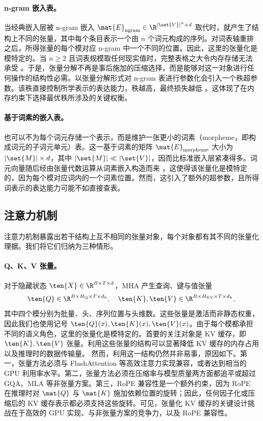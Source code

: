 \paragraph{n-gram 嵌入表。}

当经典嵌入层被 n-gram 嵌入 $\mat{E}_{\rm ngram} \in \R^{|\set{V}|^n\times d}$ \cite{huang2025overtokenized} 取代时，就产生了结构上不同的张量，其中每个条目表示一个由 $n$ 个词元构成的序列。对词表轴重排之后，所得张量的每个模对应 n-gram 中一个不同的位置。因此，这里的张量化是模特定的。当 $n\ge 2$ 且词表规模取任何现实值时，完整表格之大令内存存储无法承受 \cite{zhou2026tensorizingengram}。于是，张量分解不再是事后施加的压缩选择，而是能够对这一对象进行任何操作的结构性必需。以张量分解形式对 n-gram 表进行参数化会引入一个秩超参数。该秩直接控制所学表示的表达能力，秩越高，最终损失越低 \cite{zhou2026tensorizingengram}。这体现了在内存约束下选择最优秩所涉及的关键权衡。

\paragraph{基于词素的嵌入表。} 

也可以不为每个词元存储一个表示，而是维护一张更小的词素（morpheme，即构成词元的子词元单元）表。这一基于词素的矩阵 $\mat{E}_{\rm morpheme}$ 大小为 $|\set{M}| \times d$，其中 $|\set{M}| \ll |\set{V}|$，因而比标准嵌入层紧凑得多。词元向量随后经由张量代数运算从词素嵌入构造而来 \cite{gan2022morphte}，这使得该张量化是模特定的，因为每个模对应词内的一个词素位置。然而，这引入了额外的超参数，且所得词表示的表达能力可能不如直接查表。

\subsection{注意力机制}
\label{sec:component-att}

注意力机制暴露出若干结构上互不相同的张量对象，每个对象都有其不同的张量化理据。我们将它们归纳为三种情形。

\paragraph{Q、K、V 张量。}
对于隐藏状态 $\ten{X}\in\R^{B\times T\times d}$，MHA 产生查询、键与值张量
\begin{equation}
\ten{Q} \in \R^{B \times H_{\rm Q} \times T \times d_h}, \quad \ten{K},\ten{V}\in\R^{B\times H_{\rm KV}\times T\times d_h},
\end{equation}
其中四个模分别为批量、头、序列位置与头维数。这些张量是激活而非静态权重，因此我们也使用记号 $\ten{Q}(x), \ten{K}(x),\ten{V}(x)$。由于每个模都承担不同的语义角色，这里的张量化是模特定的。首要的关注对象是 KV 缓存，即 $\ten{K}, \ten{V}$ 张量。利用这些张量的结构可以显著降低 KV 缓存的内存占用以及推理时的数据传输量。
然而，利用这一结构仍然并非易事，原因如下。第一，张量方法必须与 FlashAttention \cite{dao2022flashattention} 等高效注意力实现兼容，或者达到相当的 GPU 利用率水平。第二，张量方法必须在压缩率与模型质量两方面都追平或超过 GQA、MLA 等非张量方案。第三，RoPE \cite{su2023rope} 兼容性是一个额外约束，因为 RoPE 在推理时对 $\mat{Q}$ 与 $\mat{K}$ 施加依赖位置的旋转；因此，任何因子化或压缩后的 KV 缓存表示都必须支持这些旋转。可见，张量化 KV 缓存的关键设计挑战在于高效的 GPU 实现、与非张量方案的竞争力，以及 RoPE 兼容性。


